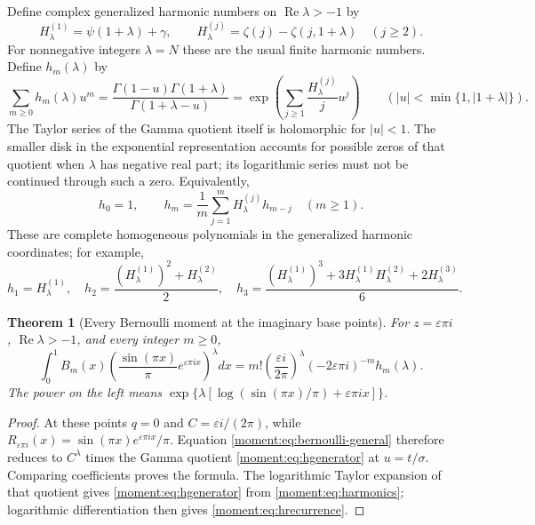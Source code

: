 \documentclass[11pt,a4paper]{article}
\numberwithin{equation}{section}
\newtheorem{theorem}{Theorem}[section]
\theoremstyle{definition}
\theoremstyle{remark}
\begin{document}
Define complex generalized harmonic numbers on
$\operatorname{Re}\lambda>-1$ by
\begin{equation}\label{moment:eq:harmonics}
 H_\lambda^{(1)}=\psi(1+\lambda)+\gamma,
 \qquad
 H_\lambda^{(j)}=\zeta(j)-\zeta(j,1+\lambda)\quad(j\ge2).
\end{equation}
For nonnegative integers $\lambda=N$ these are the usual finite
harmonic numbers. Define $h_m(\lambda)$ by
\begin{equation}\label{moment:eq:hgenerator}
 \sum_{m\ge0}h_m(\lambda)u^m
 =\frac{\Gamma(1-u)\Gamma(1+\lambda)}
        {\Gamma(1+\lambda-u)}
 =\exp\left(\sum_{j\ge1}\frac{H_\lambda^{(j)}}j u^j\right)
 \qquad (|u|<\min\{1,|1+\lambda|\}).
\end{equation}
The Taylor series of the Gamma quotient itself is holomorphic for
$|u|<1$. The smaller disk in the exponential representation accounts
for possible zeros of that quotient when $\lambda$ has negative real
part; its logarithmic series must not be continued through such a zero.
Equivalently,
\begin{equation}\label{moment:eq:hrecurrence}
 h_0=1,\qquad
 h_m=\frac1m\sum_{j=1}^m H_\lambda^{(j)}h_{m-j}\quad(m\ge1).
\end{equation}
These are complete homogeneous polynomials in the generalized
harmonic coordinates; for example,
\[
 h_1=H_\lambda^{(1)},\quad
 h_2=\frac{(H_\lambda^{(1)})^2+H_\lambda^{(2)}}2,\quad
 h_3=\frac{(H_\lambda^{(1)})^3+
        3H_\lambda^{(1)}H_\lambda^{(2)}+2H_\lambda^{(3)}}6.
\]

\begin{theorem}[Every Bernoulli moment at the imaginary base points]
\label{moment:thm:bernoulli}
For $z=\varepsilon\pi i$, $\operatorname{Re}\lambda>-1$, and
every integer $m\ge0$,
\begin{equation}\label{moment:eq:allmoments}
 \boxed{\displaystyle
 \int_0^1 B_m(x)
  \left(\frac{\sin(\pi x)}\pi e^{\varepsilon\pi i x}\right)^\lambda dx
 =m!\left(\frac{\varepsilon i}{2\pi}\right)^\lambda
       (-2\varepsilon\pi i)^{-m}h_m(\lambda).}
\end{equation}
The power on the left means
$\exp\{\lambda[\log(\sin(\pi x)/\pi)+\varepsilon\pi i x]\}$.
\end{theorem}
\begin{proof}
At these points $q=0$ and $C=\varepsilon i/(2\pi)$, while
$R_{\varepsilon\pi i}(x)=\sin(\pi x)e^{\varepsilon\pi i x}/\pi$.
Equation \eqref{moment:eq:bernoulli-general} therefore reduces to
$C^\lambda$ times the Gamma quotient
\eqref{moment:eq:hgenerator} at $u=t/\sigma$. Comparing coefficients
proves the formula. The logarithmic Taylor expansion of that quotient
gives \eqref{moment:eq:hgenerator} from
\eqref{moment:eq:harmonics}; logarithmic differentiation then gives
\eqref{moment:eq:hrecurrence}.
\end{proof}
\end{document}
